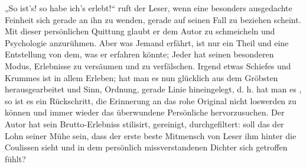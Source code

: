 „So ist’s! so habe ich’s erlebt!“ ruft der Leser, wenn eine besonders ausgedachte Feinheit sich gerade an ihn zu wenden, gerade auf seinen Fall zu beziehen scheint. Mit dieser persönlichen Quittung glaubt er dem Autor zu schmeicheln und Psychologie anzurühmen. Aber was Jemand erfährt, ist nur ein Theil und eine Entstellung von dem, was er erfahren könnte; Jeder hat seinen besonderen Modus, Erlebnisse zu versäumen und zu verfälschen. Irgend etwas Schiefes und Krummes ist in allem Erleben; hat man es nun glücklich aus dem Gröbsten herausgearbeitet und Sinn, Ordnung, gerade Linie hineingelegt, d. h. hat man es , so ist es ein Rückschritt, die Erinnerung an das rohe Original nicht loswerden zu können und immer wieder das überwundene Persönliche hervorzusuchen. Der Autor hat sein Brutto-Erlebniss stilisirt, gereinigt, durchgefiltert: soll das der Lohn seiner Mühe sein, dass der erste beste Mitmensch von Leser ihm hinter die Coulissen sieht und in dem persönlich missverstandenen Dichter sich getroffen fühlt?
\par


